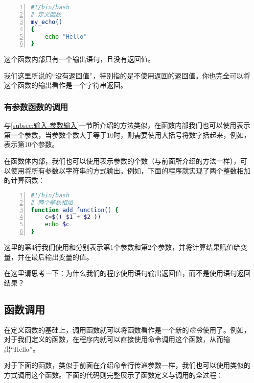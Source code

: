 \begin{lstlisting}[language=bash,numbers=left,caption={my\_echo\_function}]
#!/bin/bash
# 定义函数
my_echo()
{
    echo "Hello"
}
\end{lstlisting}

这个函数内部只有一个输出语句，且没有返回值。

\begin{extend}
    我们这里所说的“没有返回值”，特别指的是不使用返回的返回值。你也完全可以将这个函数的输出看作是一个字符串返回。
\end{extend}

\subsubsection{有参数函数的调用}

与\ref{subsec:输入-参数输入}一节所介绍的方法类似，在函数内部我们也可以使用表示第一个参数，当参数个数大于等于10时，则需要使用大括号将数字括起来，例如，表示第10个参数。

在函数体内部，我们也可以使用\code{\$\#}表示参数的个数（与前面所介绍的方法一样），可以使用\code{\$\*}将所有参数以字符串的方式输出。例如，下面的程序就实现了两个整数相加的计算函数：

\begin{lstlisting}[language=bash,numbers=left,caption={add\_function}]
#!/bin/bash
# 两个整数相加
function add_function() {
    c=$(( $1 + $2 ))
    echo $c
}
\end{lstlisting}

这里的第4行我们使用和分别表示第1个参数和第2个参数，并将计算结果赋值给变量，并在最后输出变量的值。

在这里请思考一下：为什么我们的程序使用语句输出返回值，而不是使用语句返回结果？



\subsection{函数调用}\label{subsec:函数-函数调用}

在定义函数的基础上，调用函数就可以将函数看作是一个新的\emph{命令}使用了。例如，对于我们定义的函数，在程序内就可以直接使用命令调用这个函数，从而输出“Hello”。

对于下面的函数，类似于前面在介绍命令行传递参数一样，我们也可以使用类似的方式调用这个函数。下面的代码则完整展示了函数定义与调用的全过程：

